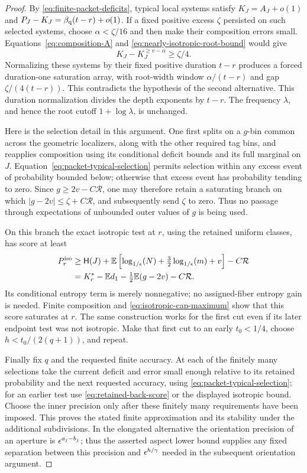 \begin{proof}
By \eqref{eq:finite-packet-deficits}, typical local systems satisfy
$K_J=A_J+o(1)$ and $P_J-K_J=\beta_{\mathrm q}(t-r)+o(1)$.
If a fixed positive excess $\zeta$ persisted on such selected
systems, choose $\alpha<\zeta/16$ and then make their composition
errors small.  Equations~\eqref{eq:composition-A} and
\eqref{eq:nearly-isotropic-root-bound} would give
\[
 K_J-K_J^{\ge v-\alpha}\ge\zeta/4.
\]
Normalizing these systems by their fixed positive duration $t-r$
produces a forced duration-one saturation array, with root-width
window $\alpha/(t-r)$ and gap $\zeta/(4(t-r))$.
This contradicts the hypothesis of the second alternative.
This duration normalization divides the depth exponents by $t-r$.
The frequency $\lambda$, and hence the root cutoff $1+\log\lambda$,
is unchanged.

Here is the selection detail in this argument.  One first splits on
a $g$-bin common across the geometric localizers, along with the other
required tag bins, and reapplies composition using its conditional
deficit bounds and its full marginal on $J$.
Equation~\eqref{eq:packet-typical-selection} permits selection within
any excess event of probability bounded below; otherwise that excess
event has probability tending to zero.  Since $g\ge2v-C\mathcal R$,
one may therefore retain a saturating branch on which
$|g-2v|\le\zeta+C\mathcal R$, and subsequently send $\zeta$ to
zero.  Thus no passage through expectations of unbounded outer
values of $g$ is being used.

On this branch the exact isotropic test at $r$, using the retained
uniform classes, has score at least
\begin{align*}
 P_r^{\rm iso}
 &\ge\mathsf H(J)+
       \mathbb E\left[\log_{1/\epsilon}\!\left(N\right)+\tfrac32\log_{1/\epsilon}\!\left(m\right)+v\right]
                   -C\mathcal R\\
 &=K_r^*-\mathbb E d_1-\tfrac12\mathbb E(g-2v)-C\mathcal R.
\end{align*}
Its conditional entropy term is merely nonnegative; no assigned-fiber
entropy gain is needed.  Finite composition and
\eqref{eq:isotropic-cap-maximum} show that this score saturates at
$r$.  The same construction works for the first cut even if its later
endpoint test was not isotropic.  Make that first cut to an early
$t_0<1/4$, choose $h<t_0/(2(q+1))$, and repeat.

Finally fix $q$ and the requested finite accuracy.  At each of the
finitely many selections take the current deficit and error small
enough relative to its retained probability and the next requested
accuracy, using \eqref{eq:packet-typical-selection}; for an earlier
test use \eqref{eq:retained-back-score} or the displayed isotropic
bound.  Choose the inner precision only after these finitely many
requirements have been imposed.  This proves the stated finite
approximation and its stability under the additional subdivisions.
In the elongated alternative the orientation precision of an aperture
is $\epsilon^{a_j-b_j}$; thus the asserted aspect lower bound supplies
any fixed separation between this precision and $\epsilon^{h/\gamma}$
needed in the subsequent orientation argument.
\end{proof}
